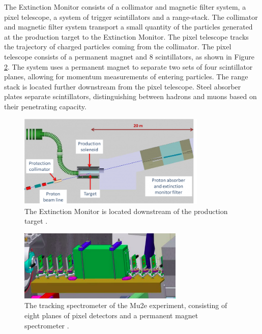 The Extinction Monitor consists of a collimator and magnetic filter 
system, a pixel telescope, a system of trigger scintillators and a range-stack. The collimator and 
magnetic filter system transport a small quantity of 
the particles generated at the production target to the Extinction Monitor. The pixel telescope 
tracks the trajectory of charged particles coming from 
the collimator. The pixel telescope consists of a permanent magnet and 8 scintillators, as shown 
in Figure \ref{fig:extintionmonitor}. The system uses a 
permanent magnet to separate two sets of four scintillator planes, allowing for momentum measurements 
of entering particles. The range stack is located further 
downstream from the pixel telescope. Steel absorber plates separate scintillators, distinguishing 
between hadrons and muons based on their penetrating capacity.
\begin{figure}[!h]
\centering
\includegraphics[width =0.8\textwidth]{figures/png/800px-Extinction_filter.png}
\caption[The Extintion Monitor location.]{The Extinction Monitor is located downstream of the
production target \cite{Prebys:IPAC2015-THPF121}.}
\label{fig:extintion}
\end{figure}
\begin{figure}[!h]
\centering
\includegraphics[width =0.7\textwidth]{figures/png/Screenshot_20240306_184720.png}
\caption[The Extintion Monitor.]{The tracking spectrometer of the Mu2e experiment, consisting of eight planes of pixel detectors and a permanent magnet spectrometer \cite{Prebys:IPAC2015-THPF121}.}
\label{fig:extintionmonitor}
\end{figure}
